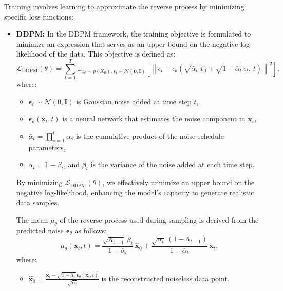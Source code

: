 Training involves learning to approximate the reverse process by minimizing specific loss functions:

\begin{itemize}
    \item \textbf{DDPM:} In the DDPM framework, the training objective is formulated to minimize an expression that serves as an upper bound on the negative log-likelihood of the data. This objective is defined as:
        \[
    \mathcal{L}_{\text{DDPM}}(\theta) = \sum_{t=1}^T \mathbb{E}_{x_0 \sim p(X_0),\, \epsilon_t \sim \mathcal{N}(\mathbf{0}, \mathbf{I})} \left[ \left\| \epsilon_t - \epsilon_\theta\left(\sqrt{\bar{\alpha}_t}\, x_0 + \sqrt{1 - \bar{\alpha}_t}\, \epsilon_t,\, t\right) \right\|^2 \right],
    \]
    where:
    \begin{itemize}
        \item \( \mathbf{\epsilon}_t \sim \mathcal{N}(0, \mathbf{I}) \) is Gaussian noise added at time step \( t \),
        \item \( \mathbf{\epsilon}_\theta(\mathbf{x}_t, t) \) is a neural network that estimates the noise component in \( \mathbf{x}_t \),
        \item \( \bar{\alpha}_t = \prod_{s=1}^t \alpha_s \) is the cumulative product of the noise schedule parameters,
        \item \( \alpha_t = 1 - \beta_t \), and \( \beta_t \) is the variance of the noise added at each time step.
    \end{itemize}

    By minimizing \( \mathcal{L}_{\text{DDPM}}(\theta) \), we effectively minimize an upper bound on the negative log-likelihood, enhancing the model's capacity to generate realistic data samples.

    The mean \( \mu_\theta \) of the reverse process used during sampling is derived from the predicted noise \( \mathbf{\epsilon}_\theta \) as follows:
    \[
    \mu_\theta(\mathbf{x}_t, t) = \frac{\sqrt{\bar{\alpha}_{t-1}}\, \beta_t}{1 - \bar{\alpha}_t}\, \hat{\mathbf{x}}_0 + \frac{\sqrt{\alpha_t}\, (1 - \bar{\alpha}_{t-1})}{1 - \bar{\alpha}_t}\, \mathbf{x}_t,
    \]
    where:
    \begin{itemize}
        \item \( \hat{\mathbf{x}}_0 = \frac{\mathbf{x}_t - \sqrt{1 - \bar{\alpha}_t}\, \mathbf{\epsilon}_\theta(\mathbf{x}_t, t)}{\sqrt{\bar{\alpha}_t}} \) is the reconstructed noiseless data point.
    \end{itemize}


\end{itemize}
